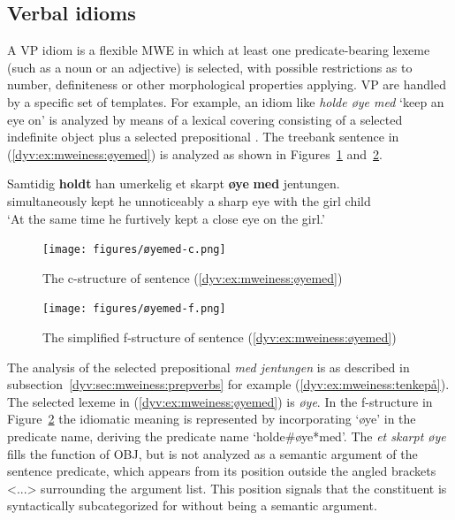 \documentclass[output=paper]{langsci/langscibook}
\begin{document}
\subsection{Verbal idioms}\label{dyv:sec:mweiness:verbalidioms}

A VP idiom is a flexible MWE in which at least one predicate-bearing lexeme (such as a noun or an adjective) is selected, with possible restrictions as to number, definiteness or other morphological properties applying.
VP  are handled by a specific set of templates.
For example, an idiom like \textit{holde øye med} `keep an eye on' is analyzed by means of a lexical  covering  consisting of a selected indefinite object plus a selected prepositional .
The treebank sentence in (\ref{dyv:ex:mweiness:øyemed}) is analyzed as shown in Figures~\ref{dyv:fig:mweiness:øyemed-c} and~\ref{dyv:fig:mweiness:øyemed-f}.

\ea\label{dyv:ex:mweiness:øyemed}
\gll Samtidig \textbf{holdt} han umerkelig et skarpt \textbf{øye} \textbf{med} jentungen. \\
     simultaneously kept he unnoticeably a sharp eye with {the girl child}\\
\glt `At the same time he furtively kept a close eye on the girl.'
\z


\begin{figure}
  \texttt{[image: figures/øyemed-c.png]}
  \caption{The c-structure of sentence (\ref{dyv:ex:mweiness:øyemed}) }
  \label{dyv:fig:mweiness:øyemed-c}
\end{figure}

\begin{figure}
  \texttt{[image: figures/øyemed-f.png]}
  \caption{The simplified f-structure of sentence (\ref{dyv:ex:mweiness:øyemed}) }
  \label{dyv:fig:mweiness:øyemed-f}
\end{figure}

The analysis of the selected prepositional  \textit{med jentungen} is as described in subsection~\ref{dyv:sec:mweiness:prepverbs} for example (\ref{dyv:ex:mweiness:tenkepå}).
The selected lexeme in (\ref{dyv:ex:mweiness:øyemed}) is \textit{øye}.
In the f-structure in Figure~\ref{dyv:fig:mweiness:øyemed-f} the idiomatic meaning is represented by incorporating `øye' in the predicate name, deriving the predicate name `holde\#øye*med'. %
The  \textit{et skarpt øye} fills the function of OBJ, but is not analyzed as a semantic argument of the sentence predicate, which appears from its position outside the angled brackets <...> surrounding the argument list.
This position signals that the constituent is syntactically subcategorized for without being a semantic argument.
\end{document}
